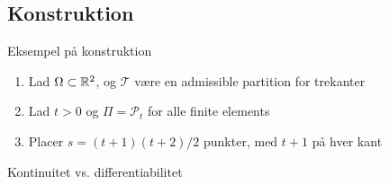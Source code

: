 \subsection{Konstruktion}
\begin{frame}{Eksempel på konstruktion}
\begin{enumerate}
    \item Lad $\Omega\subset \mathbb{R}^2$, og $\mathcal{T}$ være en admissible partition for trekanter 
    \item Lad $t >0$ og $\Pi = \mathcal{P}_t$ for alle finite elements  
    \item Placer $s = (t+1)(t+2)/2$ punkter, med $t+1$ på hver kant
\end{enumerate}
Kontinuitet vs. differentiabilitet
\end{frame}